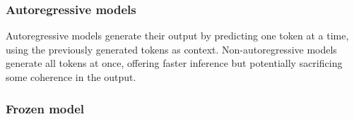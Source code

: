 \documentclass[a4paper,12pt,twoside]{article}
\newenvironment{aigen}{\begin{tcolorbox}[colback=blue!5!white, colframe=blue!75!black, title=AI-Generated Section]}{\end{tcolorbox}}
\begin{document}

\subsubsection*{Autoregressive models} \label{sec:Autoregression}

Autoregressive models generate their output by predicting one token at a time, using the previously generated tokens as context. Non-autoregressive models generate all tokens at once, offering faster inference but potentially sacrificing some coherence in the output. %

\subsubsection*{Frozen model}\label{sec:frozenModel}
\end{document}
